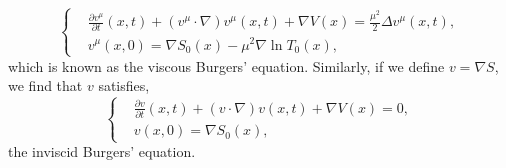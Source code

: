 \documentclass[a4paper,12pt,draft]{report}
\begin{document}
\begin{equation}
\left\{
\begin{aligned}
& \frac{\partial v^\mu}{\partial t}(x, t) + (v^\mu\cdot \nabla)v^\mu(x, t) + \nabla V(x) = \frac{\mu^2}{2}\Delta v^\mu(x, t),\\ \label{VBE}
& v^\mu(x, 0) = \nabla S_0(x) - \mu^2\nabla\ln T_0(x),
\end{aligned}
\right.
\end{equation}
which is known as the viscous Burgers' equation.  Similarly, if we define $v = \nabla S$, we find that $v$ satisfies,
\begin{equation}
\left\{
\begin{aligned}
& \frac{\partial v}{\partial t}(x, t) + (v\cdot \nabla)v(x, t) + \nabla V(x) = 0,\\
& v(x, 0) = \nabla S_0(x),
\end{aligned}
\right.
\end{equation}
the inviscid Burgers' equation.
\end{document}
